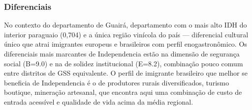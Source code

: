 \subsubsection*{Diferenciais}\label{dif-independencia-0405}
No contexto do departamento de Guairá, departamento com o mais alto IDH do interior paraguaio (0,704) e a única região vinícola do país — diferencial cultural único que atrai imigrantes europeus e brasileiros com perfil enogastronômico. Os diferenciais mais marcantes de Independencia estão na dimensão de segurança social (B=9.0) e na de solidez institucional (E=8.2), combinação pouco comum entre distritos de GSS equivalente. O perfil de imigrante brasileiro que melhor se beneficia de Independencia é o de produtores rurais diversificados, turismo boutique, mineração artesanal, que encontra aqui uma combinação de custo de entrada acessível e qualidade de vida acima da média regional.
